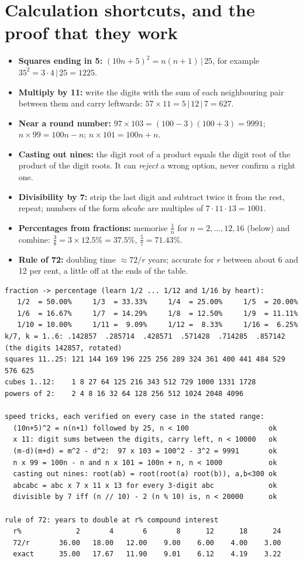 \documentclass[10pt,a4paper,openany,oneside]{report}
\newcommand{\prio}[1]{\texorpdfstring{\ifcase#1\or{\color{gold}\ding{72}}\or{\color{gold}\ding{72}\ding{72}}\or{\color{gold}\ding{72}\ding{72}\ding{72}}\fi}{}}
\begin{document}
\section{Calculation shortcuts, and the proof that they work \prio{3}}
\begin{itemize}[nosep]
\item \textbf{Squares ending in 5:} $(10n+5)^2=n(n+1)\,|\,25$, for example $35^2=3\cdot4\,|\,25=1225$.
\item \textbf{Multiply by 11:} write the digits with the sum of each neighbouring pair between them and carry leftwards: $57\times11=5\,|\,12\,|\,7=627$.
\item \textbf{Near a round number:} $97\times103=(100-3)(100+3)=9991$; $n\times99=100n-n$; $n\times101=100n+n$.
\item \textbf{Casting out nines:} the digit root of a product equals the digit root of the product of the digit roots. It can \emph{reject} a wrong option, never confirm a right one.
\item \textbf{Divisibility by 7:} strip the last digit and subtract twice it from the rest, repeat; numbers of the form $abcabc$ are multiples of $7\cdot11\cdot13=1001$.
\item \textbf{Percentages from fractions:} memorise $\frac1n$ for $n=2,\dots,12,16$ (below) and combine: $\frac38=3\times12.5\%=37.5\%$, $\frac57=71.43\%$.
\item \textbf{Rule of 72:} doubling time $\approx72/r$ years; accurate for $r$ between about 6 and 12 per cent, a little off at the ends of the table.
\end{itemize}
\begin{lstlisting}[style=out,basicstyle=\ttfamily\fontsize{7.2}{8.6}\selectfont,title={Tables to memorise and the verified tricks}]
fraction -> percentage (learn 1/2 ... 1/12 and 1/16 by heart):
   1/2  = 50.00%     1/3  = 33.33%     1/4  = 25.00%     1/5  = 20.00%
   1/6  = 16.67%     1/7  = 14.29%     1/8  = 12.50%     1/9  = 11.11%
   1/10 = 10.00%     1/11 =  9.09%     1/12 =  8.33%     1/16 =  6.25%
k/7, k = 1..6: .142857  .285714  .428571  .571428  .714285  .857142  (the digits 142857, rotated)
squares 11..25: 121 144 169 196 225 256 289 324 361 400 441 484 529 576 625
cubes 1..12:    1 8 27 64 125 216 343 512 729 1000 1331 1728
powers of 2:    2 4 8 16 32 64 128 256 512 1024 2048 4096

speed tricks, each verified on every case in the stated range:
  (10n+5)^2 = n(n+1) followed by 25, n < 100                   ok
  x 11: digit sums between the digits, carry left, n < 10000   ok
  (m-d)(m+d) = m^2 - d^2:  97 x 103 = 100^2 - 3^2 = 9991       ok
  n x 99 = 100n - n and n x 101 = 100n + n, n < 1000           ok
  casting out nines: root(ab) = root(root(a) root(b)), a,b<300 ok
  abcabc = abc x 7 x 11 x 13 for every 3-digit abc             ok
  divisible by 7 iff (n // 10) - 2 (n % 10) is, n < 20000      ok

rule of 72: years to double at r% compound interest
  r%             2       4       6       8      12      18      24
  72/r       36.00   18.00   12.00    9.00    6.00    4.00    3.00
  exact      35.00   17.67   11.90    9.01    6.12    4.19    3.22
\end{lstlisting}
\end{document}
